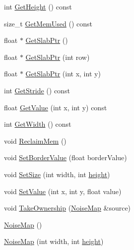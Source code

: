\begin{DoxyCompactItemize}
\item 
int \hyperlink{classnoise_1_1utils_1_1_noise_map_a8d29226f2e0300e5738556cde3214ff9}{Get\+Height} () const 
\item 
size\+\_\+t \hyperlink{classnoise_1_1utils_1_1_noise_map_acf3096d720e21b69d5c77a3483601436}{Get\+Mem\+Used} () const 
\item 
float $\ast$ \hyperlink{classnoise_1_1utils_1_1_noise_map_aed156da712e668ce73769121e11c2660}{Get\+Slab\+Ptr} ()
\item 
float $\ast$ \hyperlink{classnoise_1_1utils_1_1_noise_map_a7470c6d553db47b6527ed04e9b5874c3}{Get\+Slab\+Ptr} (int row)
\item 
float $\ast$ \hyperlink{classnoise_1_1utils_1_1_noise_map_aae1eaab13e26253382e79b75c3ab1a78}{Get\+Slab\+Ptr} (int x, int y)
\item 
int \hyperlink{classnoise_1_1utils_1_1_noise_map_af57bca1cd431312dcbe80056012224ed}{Get\+Stride} () const 
\item 
float \hyperlink{classnoise_1_1utils_1_1_noise_map_ac7a52997dc3115bcdb09d235b40e49a8}{Get\+Value} (int x, int y) const 
\item 
int \hyperlink{classnoise_1_1utils_1_1_noise_map_a8355dbe703d6c46c8bbe34112fcd172d}{Get\+Width} () const 
\item 
void \hyperlink{classnoise_1_1utils_1_1_noise_map_aa525ef83cc80c8d257a515a43e5f614e}{Reclaim\+Mem} ()
\item 
void \hyperlink{classnoise_1_1utils_1_1_noise_map_a1f315013b6efbb015c32399029641701}{Set\+Border\+Value} (float border\+Value)
\item 
void \hyperlink{classnoise_1_1utils_1_1_noise_map_aa7d1f98f133f98fdc032300417277b49}{Set\+Size} (int width, int \hyperlink{_examples_2_bezier_2_app_8cpp_a48083b65ac9a863566dc3e3fff09a5b4}{height})
\item 
void \hyperlink{classnoise_1_1utils_1_1_noise_map_a3a19cede9cb4cb3161be13517f03b4e6}{Set\+Value} (int x, int y, float value)
\item 
void \hyperlink{classnoise_1_1utils_1_1_noise_map_a6deca363f85671b9f33304718d5bb7fb}{Take\+Ownership} (\hyperlink{classnoise_1_1utils_1_1_noise_map}{Noise\+Map} \&source)
\item 
\hyperlink{classnoise_1_1utils_1_1_noise_map_a2a49984bc1167c42f5d174cda45148d7}{Noise\+Map} ()
\item 
\hyperlink{classnoise_1_1utils_1_1_noise_map_aa3fcf24a2116ef793a7d543c095b4827}{Noise\+Map} (int width, int \hyperlink{_examples_2_bezier_2_app_8cpp_a48083b65ac9a863566dc3e3fff09a5b4}{height})

\end{DoxyCompactItemize}
